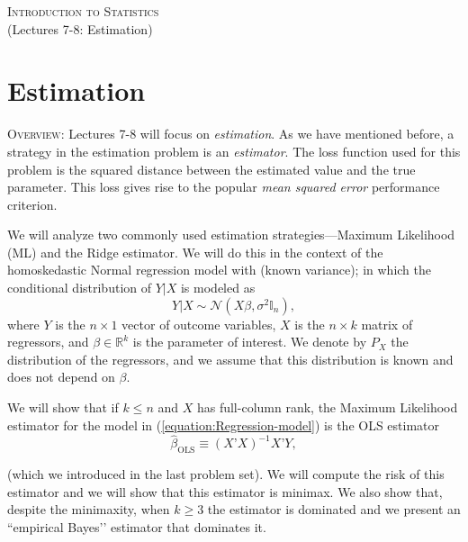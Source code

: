 \documentclass[11pt]{article} %
\begin{document}
\onehalfspace

\vspace*{\fill}
\begingroup
\centering

\Large {\scshape Introduction to Statistics}\\

(Lectures 7-8: Estimation)

\endgroup
\vspace*{\fill}

\newpage


\section{Estimation}

{\scshape Overview:} \noindent Lectures 7-8 will focus on \emph{estimation}. As we have mentioned before, a strategy in the estimation problem is an \emph{estimator}. The loss function used for this problem is the squared distance between the estimated value and the true parameter. This loss gives rise to the popular \emph{mean squared error} performance criterion. 



We will analyze two commonly used estimation strategies---Maximum Likelihood (ML) and the Ridge estimator. We will do this in the context of the homoskedastic Normal regression model with (known variance); in which the conditional distribution of $Y|X$ is modeled as
\begin{equation} \label{equation:Regression-model}
Y|X \sim \mathcal{N}(X \beta, \sigma^2 \mathbb{I}_n ), 
\end{equation}
 where $Y$ is the $n \times 1$ vector of outcome variables, $X$ is the $n \times k$ matrix of regressors, and $\beta \in \mathbb{R}^{k}$ is the parameter of interest. We denote by $P_{X}$ the distribution of the regressors, and we assume that this distribution is known and does not depend on $\beta$. 
 
 We will show that if $k \leq n$ and $X$ has full-column rank, the Maximum Likelihood estimator for the model in (\ref{equation:Regression-model}) is the OLS estimator
\[ \widehat{\beta}_{\textrm{OLS}} \equiv (X’X)^{-1} X’Y,  \]

\noindent (which we introduced in the last problem set). We will compute the risk of this estimator and we will show that this estimator is minimax. We also show that, despite the minimaxity, when $k \geq 3$ the estimator is dominated and we present an ``empirical Bayes’’ estimator that dominates it.   
\end{document}
